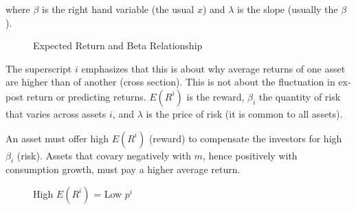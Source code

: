 where $\beta$ is the right hand variable (the usual $x$) and 
$\lambda$ is the slope (usually the $\beta$).

\begin{figure}[htbp]
    \centering
{}
    \caption{Expected Return and Beta Relationship}
    \label{fig:expected_return_beta}
\end{figure}

The superscript $i$ emphasizes that this is about 
why average returns of one asset are higher than of another 
(cross section). This is not about the fluctuation in ex-post return
or predicting returns. $E(R^i)$ is the reward, $\beta_i$ the 
quantity of risk that varies across assets $i$, and 
$\lambda$ is the price of risk (it is common to all assets).

An asset must offer high $E(R^i)$ (reward) to compensate
the investors for high $\beta_i$ (risk). 
Assets that covary negatively with $m$, hence positively 
with consumption growth, must pay a higher average return. 


\begin{tcolorbox}[colback=white, colframe=black, title=Example X]
    


\end{tcolorbox}


\begin{figure}[htbp]
    \centering
    \caption{High $E(R^i)$ = Low $p^i$}
    \label{fig:asset_pricing}
\end{figure}

